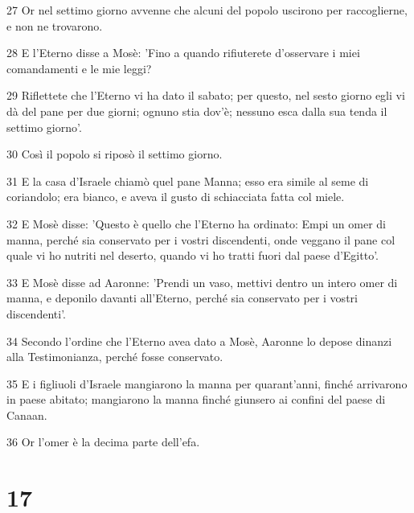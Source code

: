 \par 27 Or nel settimo giorno avvenne che alcuni del popolo uscirono per raccoglierne, e non ne trovarono.
\par 28 E l'Eterno disse a Mosè: 'Fino a quando rifiuterete d'osservare i miei comandamenti e le mie leggi?
\par 29 Riflettete che l'Eterno vi ha dato il sabato; per questo, nel sesto giorno egli vi dà del pane per due giorni; ognuno stia dov'è; nessuno esca dalla sua tenda il settimo giorno'.
\par 30 Così il popolo si riposò il settimo giorno.
\par 31 E la casa d'Israele chiamò quel pane Manna; esso era simile al seme di coriandolo; era bianco, e aveva il gusto di schiacciata fatta col miele.
\par 32 E Mosè disse: 'Questo è quello che l'Eterno ha ordinato: Empi un omer di manna, perché sia conservato per i vostri discendenti, onde veggano il pane col quale vi ho nutriti nel deserto, quando vi ho tratti fuori dal paese d'Egitto'.
\par 33 E Mosè disse ad Aaronne: 'Prendi un vaso, mettivi dentro un intero omer di manna, e deponilo davanti all'Eterno, perché sia conservato per i vostri discendenti'.
\par 34 Secondo l'ordine che l'Eterno avea dato a Mosè, Aaronne lo depose dinanzi alla Testimonianza, perché fosse conservato.
\par 35 E i figliuoli d'Israele mangiarono la manna per quarant'anni, finché arrivarono in paese abitato; mangiarono la manna finché giunsero ai confini del paese di Canaan.
\par 36 Or l'omer è la decima parte dell'efa.

\chapter{17}

